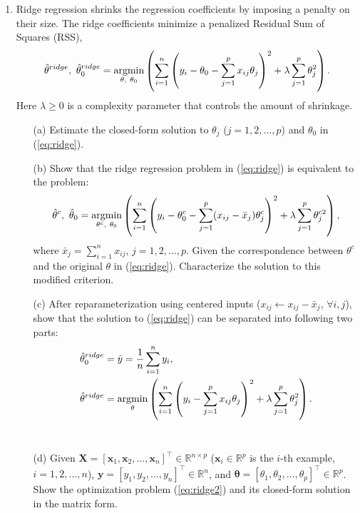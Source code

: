 \documentclass[10pt]{article}
\begin{document}
\begin{enumerate}[1.]
	\item Ridge regression shrinks the regression coefficients by imposing a penalty on their size. The ridge coefficients minimize a penalized Residual Sum of Squares (RSS),
	      \begin{equation}
		      \hat{\theta}^{ridge},~\hat{\theta}^{ridge}_0 = \mathop{\rm argmin}_{\theta,~\theta_0} \left( \sum_{i=1}^n \left( y_i-\theta_0 - \sum_{j=1}^p x_{ij} \theta_j \right)^2 + \lambda \sum_{j=1}^p \theta_j^{2} \right).
		      \label{eq:ridge}
	      \end{equation}
	      Here $\lambda \geq 0$ is a complexity parameter that controls the amount of shrinkage.
	      \begin{itemize}
		      \item[(a)] Estimate the closed-form solution to $\theta_j$ ($j=1,2,...,p$) and $\theta_0$ in (\ref{eq:ridge}). ~
		      \item[(b)] Show that the ridge regression problem in (\ref{eq:ridge}) is equivalent to the problem:
		            \begin{equation}
			            \hat{\theta}^c,~\hat{\theta}_0 = \mathop{\rm argmin}_{\theta^c,~\theta_0} \left( \sum_{i=1}^n \left( y_i-\theta_0^c - \sum_{j=1}^p (x_{ij}-\bar{x}_j)\theta_j^c \right)^2 + \lambda \sum_{j=1}^p \theta_j^{c2} \right),
		            \end{equation}
		            where $\bar{x}_j = \sum_{i=1}^n x_{ij}$, $j=1,2,...,p$.
		            Given the correspondence between $\theta^c$ and the original $\theta$ in (\ref{eq:ridge}). Characterize the solution to this modified criterion. ~
		      \item[(c)] After reparameterization using centered inputs ($x_{ij} \leftarrow x_{ij}-\bar{x}_j$, $\forall i,j$),
		            show that the solution to (\ref{eq:ridge}) can be separated into following two parts:
		            \begin{align}
			            \hat{\theta}^{ridge}_0 & = \bar{y} = \frac{1}{n} \sum_{i=1}^n y_i,                                                                                                                \\
			            \hat{\theta}^{ridge}   & = \mathop{\rm argmin}_{\theta} \left( \sum_{i=1}^n \left( y_i- \sum_{j=1}^p x_{ij} \theta_j \right)^2 + \lambda \sum_{j=1}^p \theta_j^{2} \right). \label{eq:ridge2}
		            \end{align} ~
		      \item[(d)] Given $\mathbf{X} = [\mathbf{x}_1,\mathbf{x}_2,...,\mathbf{x}_n]^\top \in \mathbb{R}^{n \times p}$ ($\mathbf{x}_i \in \mathbb{R}^p$ is the $i$-th example, $i=1,2,...,n$),
		            $\mathbf{y} = [y_1,y_2,...,y_n]^\top \in \mathbb{R}^{n}$, and $\bm\theta = [\theta_1,\theta_2,...,\theta_p]^\top \in \mathbb{R}^p$.
		            Show the optimization problem (\ref{eq:ridge2}) and its closed-form solution in the matrix form. ~
	      \end{itemize}



\end{enumerate}
\end{document}
